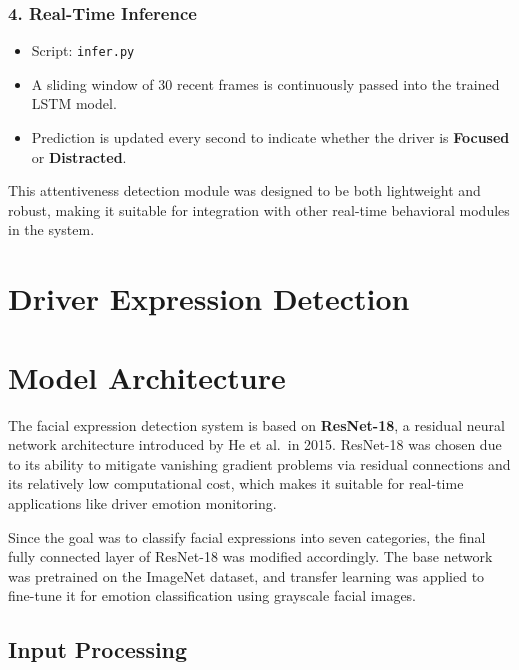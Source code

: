 \documentclass[
  letterpaper,
  DIV=11,
  numbers=noendperiod]{scrreport}
\providecommand{\tightlist}{%
  \setlength{\itemsep}{0pt}\setlength{\parskip}{0pt}}
\begin{document}
\subsubsection{4. Real-Time Inference}\label{real-time-inference}

\begin{itemize}
\tightlist
\item
  Script: \texttt{infer.py}
\item
  A sliding window of 30 recent frames is continuously passed into the
  trained LSTM model.
\item
  Prediction is updated every second to indicate whether the driver is
  \textbf{Focused} or \textbf{Distracted}.
\end{itemize}

This attentiveness detection module was designed to be both lightweight
and robust, making it suitable for integration with other real-time
behavioral modules in the system.

\section{\texorpdfstring{\textbf{Driver Expression
Detection}}{Driver Expression Detection}}\label{driver-expression-detection}

\section{Model Architecture}\label{model-architecture-2}

The facial expression detection system is based on \textbf{ResNet-18}, a
residual neural network architecture introduced by He et al.~in 2015.
ResNet-18 was chosen due to its ability to mitigate vanishing gradient
problems via residual connections and its relatively low computational
cost, which makes it suitable for real-time applications like driver
emotion monitoring.

Since the goal was to classify facial expressions into seven categories,
the final fully connected layer of ResNet-18 was modified accordingly.
The base network was pretrained on the ImageNet dataset, and transfer
learning was applied to fine-tune it for emotion classification using
grayscale facial images.

\subsection{Input Processing}\label{input-processing}
\end{document}
